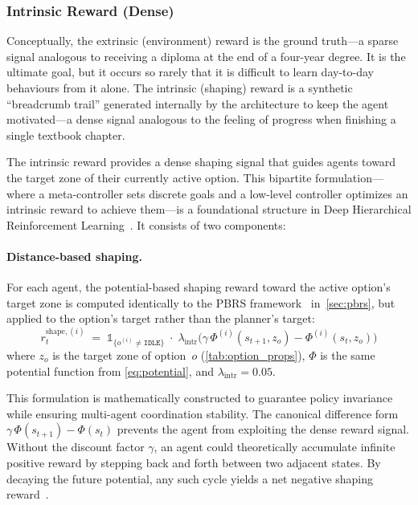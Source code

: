 \subsubsection{Intrinsic Reward (Dense)}
\label{sec:intrinsic_reward}

Conceptually, the extrinsic (environment) reward is the ground truth---a
sparse signal analogous to receiving a diploma at the end of a four-year
degree.
It is the ultimate goal, but it occurs so rarely that it is difficult to
learn day-to-day behaviours from it alone.
The intrinsic (shaping) reward is a synthetic ``breadcrumb trail''
generated internally by the architecture to keep the agent motivated---a
dense signal analogous to the feeling of progress when finishing a
single textbook chapter.

The intrinsic reward provides a dense shaping signal that guides agents
toward the target zone of their currently active option. This bipartite formulation---where a meta-controller sets discrete goals and a low-level controller optimizes an intrinsic reward to achieve them---is a foundational structure in Deep Hierarchical Reinforcement Learning~\parencite{Kulkarni_Narasimhan_Saeedi_Tenenbaum_2016}. It consists of
two components:

\paragraph{Distance-based shaping.}
For each agent, the potential-based shaping reward toward the active
option's target zone is computed identically to the PBRS framework~\parencite{Ng_Harada_Russell_1999}
in~\cref{sec:pbrs}, but applied to the option's target rather than
the planner's target:
\begin{equation}
\label{eq:hrl_shaping}
    r_t^{\text{shape},(i)}
    \;=\;
    \mathds{1}_{\{o^{(i)} \neq \texttt{IDLE}\}}
    \;\cdot\;
    \lambda_{\text{intr}}
    \bigl(\gamma\,\Phi^{(i)}(s_{t+1}, z_o) - \Phi^{(i)}(s_t, z_o)\bigr)
\end{equation}
where $z_o$ is the target zone of option~$o$
(\cref{tab:option_props}), $\Phi$ is the same potential function from
\cref{eq:potential}, and $\lambda_{\text{intr}} = 0.05$.

This formulation is mathematically constructed to guarantee policy invariance while ensuring multi-agent coordination stability. The canonical difference form $\gamma\,\Phi(s_{t+1}) - \Phi(s_t)$ prevents the agent from exploiting the dense reward signal. Without the discount factor $\gamma$, an agent could theoretically accumulate infinite positive reward by stepping back and forth between two adjacent states. By decaying the future potential, any such cycle yields a net negative shaping reward~\parencite{Ng_Harada_Russell_1999}.

